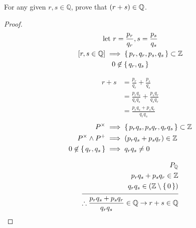 \question For any given $r, s \in \mathbb{Q}$, prove that ${ \left(r+s\right) } \in \mathbb Q$.

\begin{proof}
	\begin{gather*}
		{\text{let } } r = \frac{p_r}{q_r}, s = \frac{p_s}{q_s} \\
		{ \left[ {r, s \in {\mathbb Q}} \right] } \implies \set{p_r, q_r, p_s, q_s} \subset {\mathbb Z}\\
		0 \not\in \set{q_r, q_s}
	\end{gather*}

	\begin{align*}
		r+s & =  \frac{p_r}{q_r} + \frac{p_s}{q_s}                \\
		    & = \frac{p_r q_s}{q_r q_s} + \frac{p_s q_r}{q_s q_r} \\
		    & = \frac{p_r q_s + p_s q_r}{q_r q_s}
	\end{align*}
	\begin{align*}
		P^{\times}               & \implies  \set{p_r q_s, p_s q_r, q_r q_s} \subset {\mathbb Z} \\
		P^{\times} \wedge P^+    & \implies { \left( p_r q_s + p_s q_r \right) } \in {\mathbb Z}             \\
		0 \not\in \set{q_r, q_s} & \implies		q_r q_s \neq 0
	\end{align*}

	\begin{equation*}
		\begin{split}
			P_{{\mathbb Q}}                                                                        & \\
			p_r q_s  +    p_s q_r  \in {\mathbb Z}                                                 & \\
			q_r q_s  \in { \left({\mathbb Z}\setminus \set{0} \right) }                                       & \\[1ex]
			\hline                                                                          \\[-3ex]
			\therefore  \frac{p_r q_s + p_s q_r}{q_r q_s} \in {\mathbb Q}  \rightarrow	 r+s \in {\mathbb Q} &
		\end{split}
	\end{equation*}

\end{proof}
